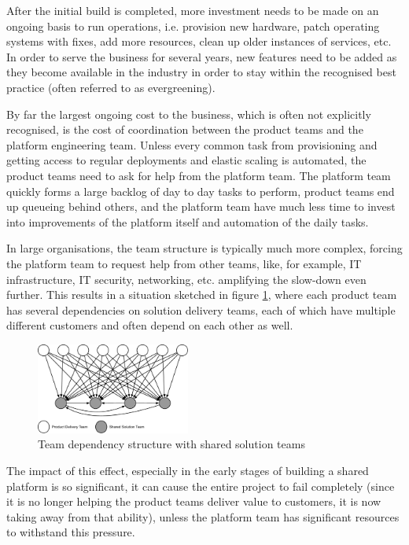 \documentclass[reprint,amsmath,amssymb,aps]{revtex4-1}
\begin{document}
After the initial build is completed, more investment needs to be made on an ongoing basis to run operations, i.e. provision new hardware, patch operating systems with fixes, add more resources, clean up older instances of services, etc. In order to serve the business for several years, new features need to be added as they become available in the industry in order to stay within the recognised best practice (often referred to as evergreening).

By far the largest ongoing cost to the business, which is often not explicitly recognised, is the cost of coordination between the product teams and the platform engineering team. Unless every common task from provisioning and getting access to regular deployments and elastic scaling is automated, the product teams need to ask for help from the platform team. The platform team quickly forms a large backlog of day to day tasks to perform, product teams end up queueing behind others, and the platform team have much less time to invest into improvements of the platform itself and automation of the daily tasks.

In large organisations, the team structure is typically much more complex, forcing the platform team to request help from other teams, like, for example, IT infrastructure, IT security, networking, etc. amplifying the slow-down even further. This results in a situation sketched in figure \ref{fig:dependencies}, where each product team has several dependencies on solution delivery teams, each of which have multiple different customers and often depend on each other as well.


\begin{figure}[h]
	\includegraphics[width=0.45\textwidth]{figs/dependencies}
	\caption{Team dependency structure with shared solution teams}
	\label{fig:dependencies}
\end{figure}

The impact of this effect, especially in the early stages of building a shared platform is so significant, it can cause the entire project to fail completely (since it is no longer helping the product teams deliver value to customers, it is now taking away from that ability), unless the platform team has significant resources to withstand this pressure.
\end{document}
